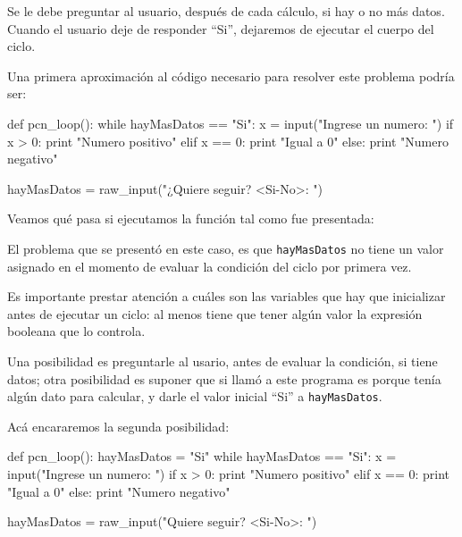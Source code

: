 Se le debe preguntar al usuario, después de cada cálculo, si hay o no más datos.
Cuando el usuario deje de responder ``Si'', dejaremos de ejecutar el cuerpo del
ciclo.

Una primera aproximación al código necesario para resolver este problema podría
ser:

\begin{codigo-python}
def pcn_loop():
    while hayMasDatos == "Si":
        x = input("Ingrese un numero: ")
        if x > 0:
            print "Numero positivo"
        elif x == 0:
            print "Igual a 0"
        else:
            print "Numero negativo"

        hayMasDatos = raw_input("¿Quiere seguir? <Si-No>: ")
\end{codigo-python}

Veamos qué pasa si ejecutamos la función tal como fue presentada:


El problema que se presentó en este caso, es que \lstinline!hayMasDatos! no
tiene un valor asignado en el momento de evaluar la condición del ciclo por
primera vez.

\begin{observacion}
Es importante prestar atención a cuáles son las variables que hay que
inicializar antes de ejecutar un ciclo: al menos tiene que tener algún valor la
expresión booleana que lo controla.
\end{observacion}

Una posibilidad es preguntarle al usario, antes de evaluar la condición, si
tiene datos; otra posibilidad es suponer que si llamó a este programa es porque
tenía algún dato para calcular, y darle el valor inicial ``Si'' a
\lstinline!hayMasDatos!.

Acá encararemos la segunda posibilidad:

\begin{codigo-python}
def pcn_loop():
    hayMasDatos = "Si"
    while hayMasDatos == "Si":
        x = input("Ingrese un numero: ")
        if x > 0:
            print "Numero positivo"
        elif x == 0:
            print "Igual a 0"
        else:
            print "Numero negativo"

        hayMasDatos = raw_input("Quiere seguir? <Si-No>: ")
\end{codigo-python}

